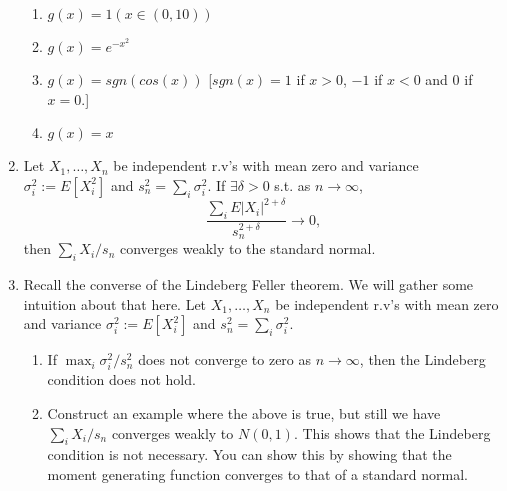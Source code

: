 \documentclass[11pt]{article}
\begin{document}
\begin{enumerate}
\begin{enumerate}
	\item $g(x)=1(x\in (0,10))$
	\item $g(x)=e^{-x^2}$
	\item $g(x)=sgn(cos(x))$ [$sgn(x)=1$ if $x>0$, $-1$ if $x<0$ and $0$ if $x=0$.]
	\item $g(x)=x$
\end{enumerate}
\item Let $X_1,\dots, X_n$ be independent r.v's with mean zero and variance $\sigma_i^2:=E[X_i^2]$ and $s_n^2=\sum_i\sigma_i^2$. If $\exists\delta>0$ s.t. as $n\rightarrow\infty$,
$$\frac{\sum_i E|X_i|^{2+\delta}}{s_n^{2+\delta}}\rightarrow 0,$$
then $\sum_i X_i/s_n$ converges weakly to the standard normal.
\item Recall the converse of the Lindeberg Feller theorem. We will gather some intuition about that here. Let $X_1,\dots, X_n$ be independent r.v's with mean zero and variance $\sigma_i^2:=E[X_i^2]$ and $s_n^2=\sum_i\sigma_i^2$. 
\begin{enumerate}
	\item If $\max_i \sigma_i^2/s_n^2$ does not converge to zero as $n\rightarrow\infty$, then the Lindeberg condition does not hold. 
	\item Construct an example where the above is true, but still we have $\sum_iX_i/s_n$ converges weakly to $N(0,1)$. This shows that the Lindeberg condition is not necessary. You can show this by showing that the moment generating function converges to that of a standard normal.
\end{enumerate}
\end{enumerate}
\end{document}
